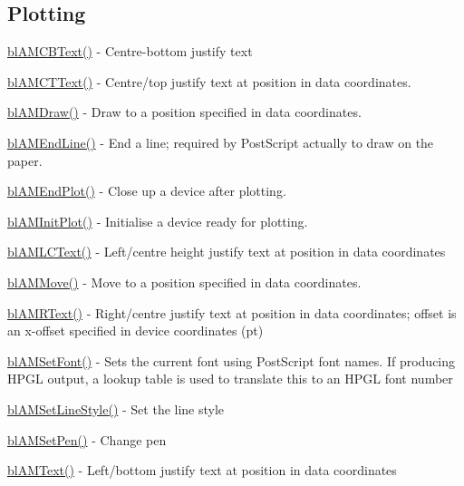 \subsection*{Plotting }


\begin{DoxyItemize}
\item \hyperlink{plotting_8c_adf7ece916af24c21f0931f0b7c4761ca}{bl\-A\-M\-C\-B\-Text()} -\/ Centre-\/bottom justify text
\item \hyperlink{plotting_8c_a383fcda4bb5fb61217074d66a6419f98}{bl\-A\-M\-C\-T\-Text()} -\/ Centre/top justify text at position in data coordinates.
\item \hyperlink{plotting_8c_aa027a19973fbfb011ff18661111233e0}{bl\-A\-M\-Draw()} -\/ Draw to a position specified in data coordinates.
\item \hyperlink{plotting_8c_ae241207f3a108ce23d0ce920141e74f2}{bl\-A\-M\-End\-Line()} -\/ End a line; required by Post\-Script actually to draw on the paper.
\item \hyperlink{plotting_8c_a5b3e1e4252999369a2240283ab892bf7}{bl\-A\-M\-End\-Plot()} -\/ Close up a device after plotting.
\item \hyperlink{plotting_8c_a882ebfb86f47355981aa7b24cfc0333e}{bl\-A\-M\-Init\-Plot()} -\/ Initialise a device ready for plotting.
\item \hyperlink{plotting_8c_a184cd5d1d049ac2afafb40c63b46c487}{bl\-A\-M\-L\-C\-Text()} -\/ Left/centre height justify text at position in data coordinates
\item \hyperlink{plotting_8c_aa9686dd307c19b521c701c41c5c50ad0}{bl\-A\-M\-Move()} -\/ Move to a position specified in data coordinates.
\item \hyperlink{plotting_8c_a914c411effe569d1e5d0825e20199af9}{bl\-A\-M\-R\-Text()} -\/ Right/centre justify text at position in data coordinates; offset is an x-\/offset specified in device coordinates (pt)
\item \hyperlink{plotting_8c_a7218a327d50fce53aa80e90c39a18105}{bl\-A\-M\-Set\-Font()} -\/ Sets the current font using Post\-Script font names. If producing H\-P\-G\-L output, a lookup table is used to translate this to an H\-P\-G\-L font number
\item \hyperlink{plotting_8c_ac977a16930392913e65c6dcc90842708}{bl\-A\-M\-Set\-Line\-Style()} -\/ Set the line style
\item \hyperlink{plotting_8c_a601ad492394598369583fb08b2ac3f72}{bl\-A\-M\-Set\-Pen()} -\/ Change pen
\item \hyperlink{plotting_8c_a85e0105685226fbc8efea525d3625341}{bl\-A\-M\-Text()} -\/ Left/bottom justify text at position in data coordinates

\end{DoxyItemize}
